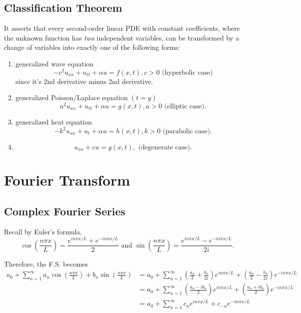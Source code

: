 \documentclass[class=article,crop=false]{standalone}
\begin{document}
\subsection{Classification Theorem}

It asserts that every second-order linear PDE with constant coefficients, where the unknown function has \emph{two} independent variables, can be transformed by a change of variables into exactly one of the following forms:
\begin{enumerate}[label=\arabic*)]
	\item generalized wave equation
		\[
			-c^2 u_{x x} + u_{tt} + \alpha u = f(x,t), c>0 \text{ (hyperbolic case)} 
		\] 
		since it's 2nd derivative minus 2nd derivative.
	\item generalized Poisson/Laplace equation $ (t=y)$
		 \[
			 a^2 u_{x x}+ u_{tt} + \alpha u = g(x,t), a>0 \text{ (elliptic case)} 
		.\] 
	\item generalized heat equation
		\[
			-k^2 u_{x x} + u_{t} + \alpha u = h(x,t), k>0 \text{ (parabolic case)} 
		.\]
	\item
		\[
			u_{x x}+ cu=g(x,t), \text{ (degenerate case)} 
		.\] 
\end{enumerate}

\newpage
\section{Fourier Transform}

\subsection{Complex Fourier Series}

Recall by Euler's formula,
\[
\cos \left( \frac{ n\pi x}{ L} \right) =\frac{e^{   i n\pi x / L} + e^{ - i n\pi x / L} }{2 } \text{ and } \sin \left( \frac{ n\pi x}{ L} \right) = \frac{e^{   i n\pi x / L} -e^{ - i n\pi x / L} }{ 2i} 
.\]

Therefore, the F.S. becomes
\begin{align*}
	a_0 + \sum_{ n= 1}^{\infty} a_n \cos \left( \frac{ n\pi x}{ L} \right) + b_n \sin \left( \frac{ n\pi x}{ L} \right) &= a_0 + \sum_{ n= 1}^{\infty} \left( \frac{a_n}{2 }+ \frac{b_n}{2i } \right) e^{   i n\pi x / L} + \left( \frac{a_n}{2 } - \frac{b_n}{2i } \right)  e^{ - i n\pi x / L}  \\
															    &= a_0 + \sum_{ n= 1}^{\infty} \left( \frac{a_n - i b_n}{2 } \right) e^{   i n\pi x / L} + \left( \frac{a_n + ib_n}{2 } \right) e^{ - i n\pi x / L}    \\
															    &= a_0 + \sum_{ n= 1}^{\infty} c_n e^{   i n\pi x / L} + c_{-n} e^{ - i n\pi x / L}  \\
\end{align*}
\end{document}
